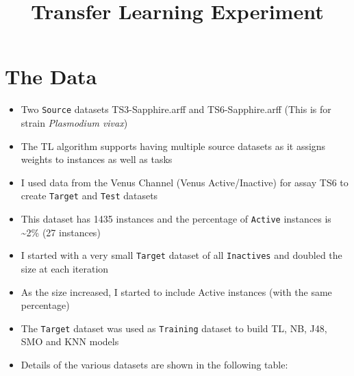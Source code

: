 \documentclass[a4paper,12pt, english]{article}
\begin{document}
\title{Transfer Learning Experiment}
\section{The Data}
\begin{itemize}
\item Two \texttt{Source} datasets TS3-Sapphire.arff and TS6-Sapphire.arff (This is for strain \emph{Plasmodium vivax})
\item The TL algorithm supports having multiple source datasets as it assigns weights to instances as well as tasks
\item I used data from the Venus Channel (Venus Active/Inactive) for assay TS6 to create \texttt{Target} and \texttt{Test} datasets
\item This dataset has 1435 instances and the percentage of \texttt{Active} instances is \textasciitilde2\% (27 instances)
\item I started with a very small \texttt{Target} dataset of all \texttt{Inactives} and doubled the size at each iteration
\item As the size increased, I started to include Active instances (with the same percentage)
\item The \texttt{Target} dataset was used as \texttt{Training} dataset to build TL, NB, J48, SMO and KNN models
\item Details of the various datasets are shown in the following table:


\end{itemize}
\end{document}
